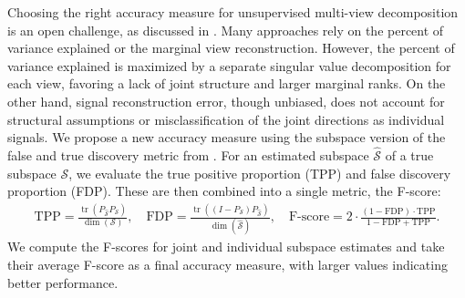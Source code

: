\documentclass{amsart}
\DeclareMathOperator*{\Tr}{tr}
\begin{document}
Choosing the right accuracy measure for unsupervised multi-view decomposition is an open challenge, as discussed in \citet{gaynanova2024comments}. Many approaches rely on the percent of variance explained or the marginal view reconstruction. However, the percent of variance explained is maximized by a separate singular value decomposition for each view, favoring a lack of joint structure and larger marginal ranks. On the other hand, signal reconstruction error, though unbiased, does not account for structural assumptions or misclassification of the joint directions as individual signals. We propose a new accuracy measure using the subspace version of the false and true discovery metric from \citet{taeb2020false}. For an estimated subspace $\widehat{\mathcal{S}}$ of a true subspace $\mathcal{S}$, we evaluate the true positive proportion (TPP) and false discovery proportion (FDP). These are then combined into a single metric,  the F-score:
\begin{eqnarray}
\label{eqn:fdr}
   \text{TPP} = \frac{\Tr(P_{\widehat{\mathcal{S}}}P_{\mathcal{S}})}{\dim(\mathcal{S})}, \quad  \text{FDP} = \frac{\Tr\left(\left(I - P_{\mathcal{S}}\right) P_{\widehat{\mathcal{S}}}\right)}{\dim(\widehat{\mathcal{S}})}, \quad
   \text{F-score} = 2 \cdot \frac{(1 - \text{FDP}) \cdot \text{TPP}}{1 - \text{FDP} + \text{TPP}}.
\end{eqnarray}
We compute the F-scores for joint and individual subspace estimates and take their average F-score as a final accuracy measure, with larger values indicating better performance.
\end{document}
